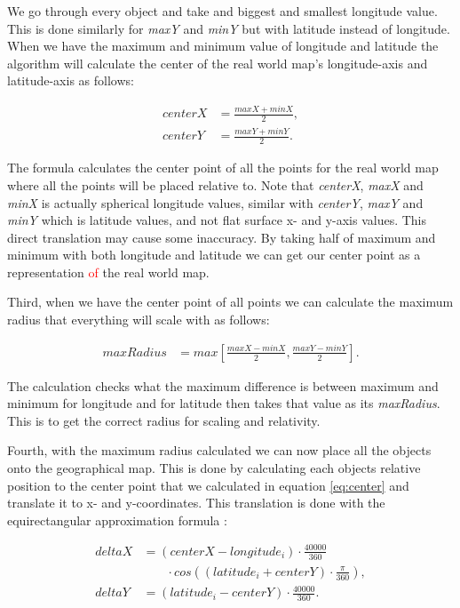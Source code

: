 We go through every object and take and biggest and smallest longitude value. This is done similarly for \textit{maxY} and \textit{minY} but with latitude instead of longitude. When we have the maximum and minimum value of longitude and latitude the algorithm will calculate the center of the real world map's longitude-axis and latitude-axis as follows:

\begin{align}
\label{eq:center}
centerX &= \frac{maxX+minX}{2},  \\
centerY &= \frac{maxY+minY}{2}. \nonumber
\end{align}

The formula calculates the center point of all the points for the real world map where all the points will be placed relative to. Note that \textit{centerX}, \textit{maxX} and \textit{minX} is actually spherical longitude values, similar with \textit{centerY}, \textit{maxY} and \textit{minY} which is latitude values, and not flat surface x- and y-axis values. This direct translation may cause some inaccuracy. By taking half of maximum and minimum with both longitude and latitude we can get our center point as a representation \textcolor{red}{of} the real world map.
 
Third, when we have the center point of all points we can calculate the maximum radius that everything will scale with as follows:

\begin{align}
\label{eq:radius}
maxRadius &= max[\frac{maxX-minX}{2}, \frac{maxY-minY}{2}].
\end{align}

The calculation checks what the maximum difference is between maximum and minimum for longitude and for latitude then takes that value as its \textit{maxRadius}. This is to get the correct radius for scaling and relativity.

Fourth, with the maximum radius calculated we can now place all the objects onto the geographical map. This is done by calculating each objects relative position to the center point that we calculated in equation \ref{eq:center} and translate it to x- and y-coordinates. This translation is done with the equirectangular approximation formula \cite{equi}:

\begin{align}
\label{eq:equiretangular}
deltaX &= (centerX-longitude_i)\cdot\frac{40000}{360} \\
 &\phantom{b=\,} \cdot cos((latitude_i+centerY) \cdot \frac{\pi}{360}), \nonumber\\
deltaY &= (latitude_i-centerY)\cdot\frac{40000}{360}. \nonumber
\end{align}

